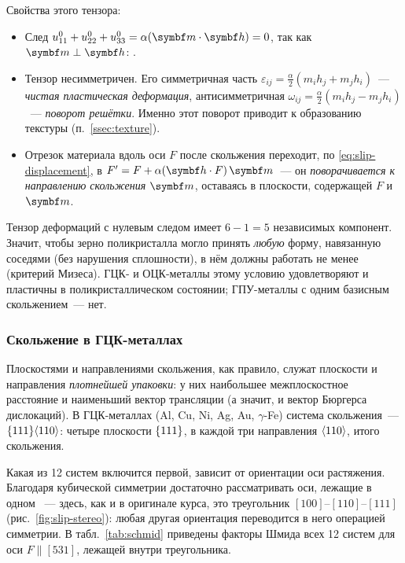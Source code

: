Свойства этого тензора:
\begin{itemize}
\item След $u^0_{11}+u^0_{22}+u^0_{33}=\alpha(\vb m\cdot\vb h)=0$, так как
$\vb m\perp\vb h$: .
\item Тензор несимметричен. Его симметричная часть
$\varepsilon_{ij}=\frac\alpha2(m_ih_j+m_jh_i)$~— \emph{чистая пластическая
деформация}, антисимметричная
$\omega_{ij}=\frac\alpha2(m_ih_j-m_jh_i)$~— \emph{поворот решётки}.
Именно этот поворот приводит к образованию текстуры (п.~\ref{ssec:texture}).
\item Отрезок материала вдоль оси $F$ после скольжения переходит, по
\eqref{eq:slip-displacement}, в $F'=F+\alpha(\vb h\cdot F)\,\vb m$~— он
\emph{поворачивается к направлению скольжения} $\vb m$, оставаясь в
плоскости, содержащей $F$ и $\vb m$.
\end{itemize}

\begin{smysl}
Тензор деформаций с нулевым следом имеет $6-1=5$ независимых компонент.
Значит, чтобы зерно поликристалла могло принять \emph{любую} форму,
навязанную соседями (без нарушения сплошности), в нём должны работать
не менее  (критерий Мизеса).
ГЦК- и ОЦК-металлы этому условию удовлетворяют и пластичны в
поликристаллическом состоянии; ГПУ-металлы с одним базисным скольжением~—
нет.
\end{smysl}

\subsubsection{Скольжение в ГЦК-металлах}

Плоскостями и направлениями скольжения, как правило, служат плоскости и
направления \emph{плотнейшей упаковки}: у них наибольшее межплоскостное
расстояние и наименьший вектор трансляции (а значит, и вектор Бюргерса
дислокаций). В ГЦК-металлах (Al, Cu, Ni, Ag, Au, $\gamma$-Fe) система
скольжения~— $\{111\}\langle 110\rangle$: четыре плоскости $\{111\}$, в
каждой три направления $\langle 110\rangle$, итого 
скольжения.

Какая из 12 систем включится первой, зависит от ориентации оси
растяжения. Благодаря кубической симметрии достаточно рассматривать оси,
лежащие в одном ~—
здесь, как и в оригинале курса, это треугольник
$[100]$--$[110]$--$[111]$ (рис.~\ref{fig:slip-stereo}): любая другая
ориентация переводится в него операцией симметрии. В табл.~\ref{tab:schmid}
приведены факторы Шмида всех 12 систем для оси $F\parallel[531]$, лежащей
внутри треугольника.

